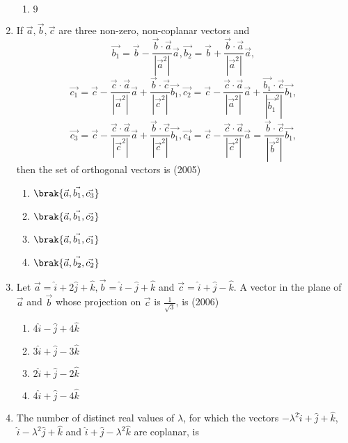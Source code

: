 \begin{enumerate}[label=\thesubsection.\arabic*.,ref=\thesubsection.\theenumi]
\begin{multicols}{4}
\begin{enumerate}
    		\item $9$
    	\end{enumerate}
    \end{multicols}
    \item If $\vec{a}, \vec{b}, \vec{c}$ are three non-zero, non-coplanar vectors and 
	    $$\vec{b_1} = \vec{b} - \frac{\vec{b} \cdot \vec{a}}{|\vec{a}^2|} \vec{a}, \vec{b_2} = \vec{b} + \frac{\vec{b} \cdot \vec{a}}{|\vec{a}^2|} \vec{a},
$$
$$	    \vec{c_1} = \vec{c} - \frac{\vec{c} \cdot \vec{a}}{|\vec{a}^2|} \vec{a} + \frac{\vec{b} \cdot \vec{c}}{|\vec{c}^2|} \vec{b_1}, \vec{c_2} = \vec{c} - \frac{\vec{c} \cdot \vec{a}}{|\vec{a}^2|} \vec{a} + \frac{\vec{b_1} \cdot \vec{c}}{|\vec{b_1}^2|} \vec{b_1},$$
$$\vec{c_3} = \vec{c} - \frac{\vec{c} \cdot \vec{a}}{|\vec{c}^2|} \vec{a} + \frac{\vec{b} \cdot \vec{c}}{|\vec{c}^2|} \vec{b_1}, \vec{c_4} = \vec{c} - \frac{\vec{c} \cdot \vec{a}}{|\vec{c}^2|} \vec{a} = \frac{\vec{b} \cdot \vec{c}}{|\vec{b}^2|} \vec{b_1},$$ 
%
then the set of orthogonal vectors is 
    \hfill{(2005)}
    \begin{multicols}{4}
    	\begin{enumerate}
    		\item $\brak{\vec{a}, \vec{b_1}, \vec{c_3}}$
    		\item $\brak{\vec{a}, \vec{b_1}, \vec{c_2}}$
    		\item $\brak{\vec{a}, \vec{b_1}, \vec{c_1}}$
    		\item $\brak{\vec{a}, \vec{b_2}, \vec{c_2}}$
    	\end{enumerate}
    \end{multicols}
    \item Let $\vec{a} = \hat{i} + 2\hat{j} + \hat{k}, \vec{b} = \hat{i}-\hat{j}+\hat{k}$  and  $\vec{c}= \hat{i}+\hat{j}-\hat{k}$. A vector in the plane of $\vec{a}$  and  $\vec{b}$ whose projection on $\vec{c}$ is $\frac{1}{\sqrt{3}}$, is
    \hfill{(2006)}
  \begin{multicols}{4}
    \begin{enumerate}
    	\item $4\hat{i} - \hat{j} + 4\hat{k}$
    	\item $3\hat{i} + \hat{j} - 3\hat{k}$
    	\item $2\hat{i} + \hat{j} - 2\hat{k}$
    	\item $4\hat{i} + \hat{j} - 4\hat{k}$
    \end{enumerate}
  \end{multicols}
    \item The number of distinct real values of $\lambda$, for which the vectors $-\lambda^{2}\hat{i} + \hat{j} + \hat{k}$, $\hat{i} - \lambda^{2}\hat{j} + \hat{k}$  and  $\hat{i} + \hat{j} - \lambda^{2}\hat{k}$ are coplanar, is

\end{enumerate}
